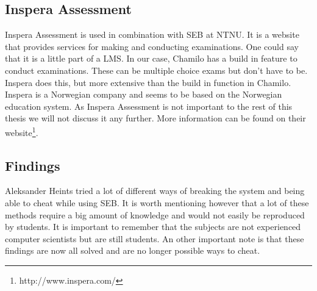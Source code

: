 \subsection{Inspera Assessment}
Inspera Assessment is used in combination with SEB at NTNU. It is a website that provides services for making and conducting examinations. One could say that it is a little part of a LMS. In our case, Chamilo has a build in feature to conduct examinations. These can be multiple choice exams but don't have to be.  Inspera does this, but more extensive than the build in function in Chamilo. Inspera is a Norwegian company and seems to be based on the Norwegian education system. As Inspera Assessment is not important to the rest of this thesis we will not discuss it any further. More information can be found on their website\footnote{http://www.inspera.com/}.

\subsection{Findings}
Aleksander Heints tried a lot of different ways of breaking the system and being able to cheat while using SEB. It is worth mentioning however that a lot of these methods require a big amount of knowledge and would not easily be reproduced by students. It is important to remember that the subjects are not experienced computer scientists but are still students. An other important note is that these findings are now all solved and are no longer possible ways to cheat.\\

